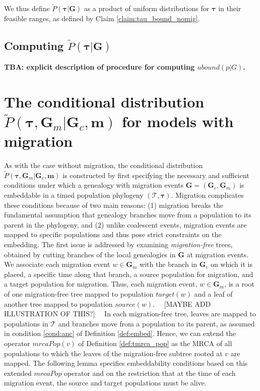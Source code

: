\documentclass[11pt]{article}
\newcommand{\vect}[1]{\boldsymbol{\mathbf{#1}}}
\newcommand{\Tr}{\mathcal{T}}
\newcommand{\G}{\vect{G}}
\newcommand{\Pref}{\widetilde{P}}
\newcommand{\1}{\mathbbm{1}}
\newcommand{\Gc}{\G_c}
\newcommand{\Gm}{\G_m}
\newcommand{\taus}{\vect\tau}
\newcommand{\migs}{\vect{m}}
\begin{document}
We thus define $\Pref(\taus|\G)$ as a product of uniform distributions for $\taus$ in their feasible ranges, as defined by Claim \ref{claim:tau_bound_nomig}.

\subsection*{Computing $\Pref(\taus|\G)$}

\textbf{TBA: explicit description of procedure for computing $ubound(p|G)$.}

\section{\texorpdfstring{The conditional distribution  $\Pref(\taus,\Gm|\Gc,\migs)$ for models with migration}{Conditional distribution with migration}}\label{ap:cond_mig}

As with the case without migration, the conditional distribution $\Pref(\taus,\Gm|\Gc,\migs)$ is constructed by first specifying the necessary and sufficient conditions
under which a genealogy with migration events $\G=(\Gc,\Gm)$ is embeddable in a timed population phylogeny $(\Tr,\taus)$.
%
Migration complicates these conditions because of two main reasons:
(1) migration breaks the fundamental assumption that genealogy branches move from a population to its parent in the phylogeny,
and (2) unlike coalescent events, migration events are mapped to specific populations and thus pose strict constraints on the embedding.
%
The first issue is addressed by examining \emph{migration-free} trees, obtained by cutting branches of the local genealogies in $\G$ at migration events.
%
We associate each migration event  $w\in\Gm$ with the branch in $\Gc$ on which it is placed, a specific time along that branch, a source population for migration, and a target population for migration.
%
Thus, each migration event, $w\in\Gm$, is a root of one migration-free tree mapped to population $target(w)$ and a leaf of another tree mapped to population $source(w)$.
~~[MAYBE ADD ILLUSTRATION OF THIS?]~~
%
In each migration-free tree, leaves are mapped to populations in $\Tr$ and branches move from a population to its parent, as assumed in condition \ref{cond:anc} of Definition \ref{def:embed}.
Hence, we can extend the operator $mrcaPop(v)$ of Definition \ref{def:tmrca_pop} as the MRCA of all populations to which the leaves of the migration-free subtree rooted at $v$ are mapped.
%
The following lemma specifies embeddability conditions based on this extended $mrcaPop$ operator and on the restriction that at the time of each migration event,
the source and target populations must be alive.
\end{document}

